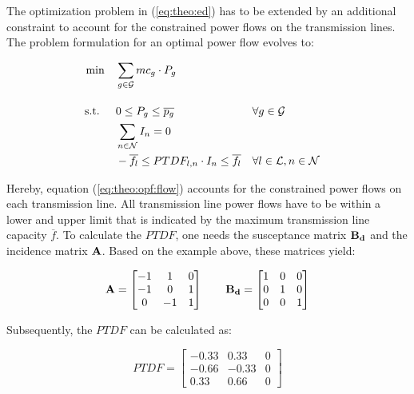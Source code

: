 The optimization problem in (\ref{eq:theo:ed}) has to be extended by an additional constraint to account for the constrained power flows on the transmission lines. The problem formulation for an optimal power flow evolves to:

\begin{subequations}
	\begin{align}
		 \min \quad & \sum_{g\in\mathcal{G}}mc_g \cdot P_{g} \label{eq:theo:opf} \\[10pt]
		 \text{s.t. } \quad & 0 \leq P_{g} \leq \overline{p_g} && \forall g \in \mathcal{G} \\
		 & \sum_{n \in \mathcal{N}} I_n = 0 \label{eq:theo:opf:balance} \\
		 & -\overline{f_l} \leq PTDF_{l,n} \cdot I_n \leq \overline{f_l} && \forall l \in \mathcal{L}, n \in \mathcal{N} \label{eq:theo:opf:flow}
	\end{align}
\end{subequations}

Hereby, equation (\ref{eq:theo:opf:flow}) accounts for the constrained power flows on each transmission line. All transmission line power flows have to be within a lower and upper limit that is indicated by the maximum transmission line capacity $\overline{f}$. To calculate the $PTDF$, one needs the susceptance matrix $\vb{B_d}$ and the incidence matrix $\vb{A}$. Based on the example above, these matrices yield:

\begin{equation}
	\vb{A} = \begin{bmatrix}
		-1 & 1 & 0 \\
		-1 & 0 & 1 \\
		0 & -1 & 1
	\end{bmatrix} \quad \quad 
	\vb{B_d} = \begin{bmatrix}
		1 & 0 & 0 \\
		0 & 1 & 0 \\
		0 & 0 & 1
	\end{bmatrix}
\end{equation}


Subsequently, the $PTDF$ can be calculated as:

\begin{equation}
	PTDF = \begin{bmatrix}
		-0.33 & 0.33 & 0 \\
		-0.66 & -0.33 & 0 \\
		0.33 & 0.66 & 0
	\end{bmatrix}
\end{equation}

